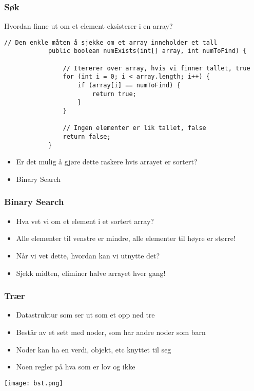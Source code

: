 \documentclass[norsk]{beamer}
\begin{document}
    \begin{frame}[fragile]
        \frametitle{Søk}
        Hvordan finne ut om et element eksisterer i en array?
        \pause
        \begin{lstlisting}[basicstyle=\scriptsize]
            // Den enkle måten å sjekke om et array inneholder et tall
            public boolean numExists(int[] array, int numToFind) {

                // Itererer over array, hvis vi finner tallet, true
                for (int i = 0; i < array.length; i++) {
                    if (array[i] == numToFind) {
                        return true;
                    }
                }

                // Ingen elementer er lik tallet, false
                return false;
            }
		\end{lstlisting}

        \begin{itemize}
            \item Er det mulig å gjøre dette raskere hvis arrayet er sortert?
            \pause
        \item Binary Search {\Emoji🤯}
        \end{itemize}
    \end{frame}

    \begin{frame}
        \frametitle{Binary Search}

        \begin{itemize}
            \item Hva vet vi om et element i et sortert array?
            \pause
            \item Alle elementer til venstre er mindre, alle elementer til høyre er
                større!
            \pause
            \item Når vi vet dette, hvordan kan vi utnytte det?
            \pause
            \item Sjekk midten, eliminer halve arrayet hver gang!
        \end{itemize}
    \end{frame}


    \begin{frame}
        \frametitle{Trær}
        \begin{itemize}
            \item Datastruktur som ser ut som et opp ned tre
            \item Består av et sett med noder, som har andre noder som barn
            \item Noder kan ha en verdi, objekt, etc knyttet til seg
            \item Noen regler på hva som er lov og ikke
        \end{itemize}

        \texttt{[image: bst.png]}

    \end{frame}
\end{document}
